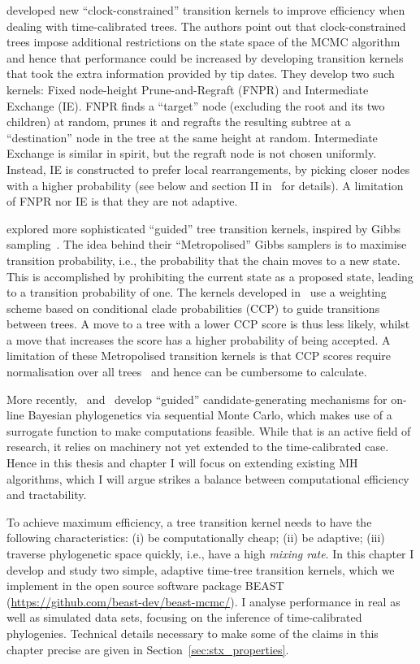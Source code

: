 \cite{Hoehna2008} developed new ``clock-constrained'' transition kernels to improve efficiency when dealing with time-calibrated trees. 
The authors point out that clock-constrained trees impose additional restrictions on the state space of the MCMC algorithm and hence that performance could be increased by developing transition kernels that took the extra information provided by tip dates.
They develop two such kernels: Fixed node-height Prune-and-Regraft (FNPR) and Intermediate Exchange (IE).
FNPR finds a ``target'' node (excluding the root and its two children) at random, prunes it and regrafts the resulting subtree at a ``destination'' node in the tree at the same height at random.
Intermediate Exchange is similar in spirit, but the regraft node  is not chosen uniformly. 
Instead, IE is constructed to prefer local rearrangements, by picking closer nodes with a higher probability (see below and section II in~\cite{Hoehna2008} for details).
A limitation of FNPR nor IE is that they are not adaptive.

\cite{Hoehna2012} explored more sophisticated ``guided'' tree transition kernels, inspired by Gibbs sampling~\citep{Geman1984}.
The idea behind their ``Metropolised'' Gibbs samplers is to maximise transition probability, i.e., the probability that the chain moves to a new state.
This is accomplished by prohibiting the current state as a proposed state, leading to a transition probability of one.
The kernels developed in~\cite{Hoehna2012} use a weighting scheme based on conditional clade probabilities (CCP) to guide transitions between trees.
A move to a tree with a lower CCP score is thus less likely, whilst a move that increases the score has a higher probability of being accepted.
A limitation of these Metropolised transition kernels is that CCP scores require normalisation over all trees~\citep{Larget2013} and hence can be cumbersome to calculate.

More recently,~\cite{Dinh2016} and~\cite{Fourment2017} develop ``guided'' candidate-generating mechanisms for on-line Bayesian phylogenetics via sequential Monte Carlo, which makes use of a surrogate function to make computations feasible.
While that is an active field of research, it relies on machinery not yet extended to the time-calibrated case.
Hence in this thesis and chapter I will focus on extending existing MH algorithms, which I will argue strikes a balance between computational efficiency and tractability.

To achieve maximum efficiency, a tree transition kernel needs to have the following characteristics: (i) be computationally cheap; (ii) be adaptive; (iii) traverse phylogenetic space quickly, i.e., have a high \textit{mixing rate}.
In this chapter I develop and study two simple, adaptive time-tree transition kernels, which we implement in the open source software package BEAST (\url{https://github.com/beast-dev/beast-mcmc/}).
I analyse performance in real as well as simulated data sets, focusing on the inference of time-calibrated phylogenies.
Technical details necessary to make some of the claims in this chapter precise are given in Section~\ref{sec:stx_properties}. %

